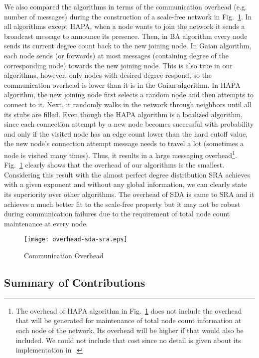 \documentclass[10pt,journal,cspaper,compsoc]{IEEEtran}
\begin{document}
We also compared the algorithms in terms of the communication overhead (e.g. number of messages) during the construction of a scale-free network in Fig.~\ref{fig:overhead}. In all algorithms except HAPA, when a node wants to join the network it sends a broadcast message to announce its presence. Then, in BA algorithm every node sends its current degree count back to the new joining node. In Gaian algorithm, each node sends (or forwards) at most  messages (containing degree of the corresponding node) towards the new joining node. This is also true in our algorithms, however, only nodes with desired degree respond, so the communication overhead is lower than it is in the Gaian algorithm. In HAPA algorithm, the new joining node first selects a random node and then attempts to connect to it. Next, it randomly walks in the network through neighbors until all its stubs are filled. Even though the HAPA algorithm is a localized algorithm, since each connection attempt by a new node becomes successful with probability  and only if the visited node has an edge count lower than the hard cutoff value, the new node's connection attempt message needs to travel a lot (sometimes a node is visited many times). Thus, it results in a large messaging overhead\footnote{The overhead of HAPA algorithm in Fig.~\ref{fig:overhead} does not include the overhead that will be generated for maintenance of total node count information at each node of the network. Its overhead will be higher if that would also be included. We could not include that cost since no detail is given about its implementation in~\cite{guclu}.}. Fig.~\ref{fig:overhead} clearly shows that the overhead of our algorithms is the smallest. Considering this result with the almost perfect degree distribution SRA achieves with a given exponent and without any global information, we can clearly state its superiority over other algorithms. The overhead of SDA is same to SRA and it achieves a much better fit to the scale-free property but it may not be robust during communication failures due to the requirement of total node count maintenance at every node.

\begin{figure}
\centering
\texttt{[image: overhead-sda-sra.eps]}
\caption{Communication Overhead}
\label{fig:overhead}
\end{figure}



\subsection{Summary of Contributions}
\end{document}
